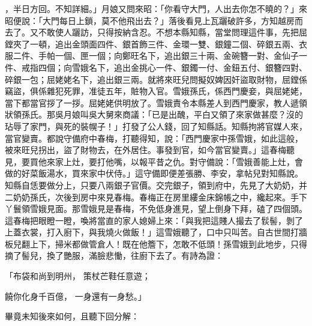 ，半日方回。不知詳細。」月娘又問來昭：「你看守大門，人出去你怎不曉的？」來昭便說：「大門每日上鎖，莫不他飛出去？」落後看見上瓦躧破許多，方知越房而去了。又不敢使人躧訪，只得按納含忍。不想本縣知縣，當堂問理這件事，先把屈鏜夾了一頓，追出金頭面四件、銀首飾三件、金環一雙、銀鐘二個、碎銀五兩、衣服二件、手帕一個、匣一個；向鄭旺名下，追出銀三十兩、金碗簪一對、金仙子一件、戒指四個；向雪娥名下，追出金挑心一件、銀鐲一付、金鈕五付、銀簪四對、碎銀一包；屈姥姥名下，追出銀三兩。就將來旺兒問擬奴婢因奸盜取財物，屈鏜係竊盜，俱係雜犯死罪，准徒五年，賍物入官。雪娥孫氏，係西門慶妾，與屈姥姥，當下都當官拶了一拶。屈姥姥供明放了。雪娥責令本縣差人到西門慶家，教人遞領狀領孫氏。那吳月娘叫吳大舅來商議：「已是出醜，平白又領了來家做甚麼？沒的玷辱了家門，與死的裝幌子！」打發了公人錢，回了知縣話。知縣拘將官媒人來，當官變賣。都說守備府中春梅，打聽得知，說：「西門慶家中孫雪娥，如此這般，被來旺兒拐出，盜了財物去，在外居住。事發到官，如今當官變賣。」這春梅聽見，要買他來家上灶，要打他嘴，以報平昔之仇。對守備說：「雪娥善能上灶，會做的好菜飯湯水，買來家中伏侍。」這守備即便差張勝、李安，拿帖兒對知縣說。知縣自恁要做分上，只要八兩銀子官價。交完銀子，領到府中，先見了大奶奶，并二奶奶孫氏，次後到房中來見春梅。春梅正在房里縷金床錦帳之中，纔起來。手下丫鬟領雪娥見面。那雪娥見是春梅，不免低身進見，望上倒身下拜，磕了四個頭。這春梅把眼瞪一瞪，喚將當直的家人媳婦上來：「與我把這賤人撮去了䯼髻，剝了上蓋衣裳，打入廚下，與我燒火做飯！」這雪娥聽了，口中只叫苦。自古世間打牆板兒翻上下，掃米都做管倉人！既在他簷下，怎敢不低頭！孫雪娥到此地步，只得摘了髻兒，換了艷服，滿臉悲慟，往廚下去了。有詩為證：

「布袋和尚到明州，  策杖芒鞋任意遊；

饒你化身千百億，  一身還有一身愁。」

畢竟未知後來如何，且聽下回分解：

